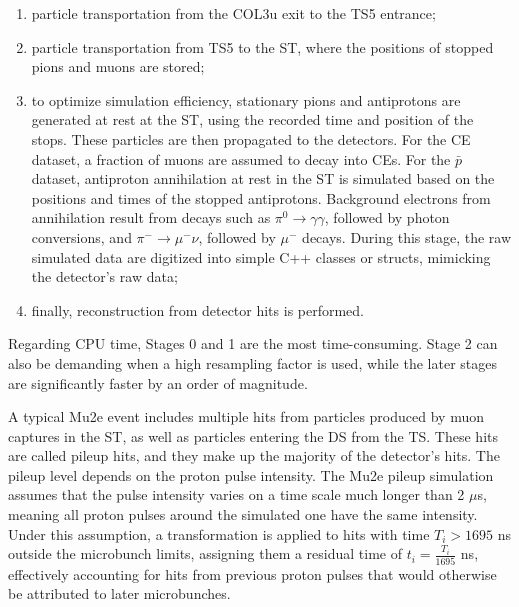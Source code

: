 \begin{enumerate}
    \item particle transportation from the COL3u exit to the TS5 entrance;

    \item particle transportation from TS5 to the ST, 
    where the positions of stopped pions and muons are stored;

    \item to optimize simulation 
    efficiency, stationary pions and antiprotons are 
    generated at rest at the ST, using the recorded time and 
    position of the stops. These particles 
    are then propagated to the detectors. 
    For the CE dataset, a fraction of muons 
    are assumed to decay into CEs. For the $\bar{p}$ dataset, 
    antiproton annihilation at rest in the ST 
    is simulated based on the positions 
    and times of the stopped antiprotons. Background 
    electrons from annihilation 
    result from decays such as $\pi^0 \to \gamma \gamma$, 
    followed by photon conversions, and $\pi^- \to \mu^- \nu$, 
    followed by $\mu^-$ decays. During 
    this stage, the raw simulated data are digitized 
    into simple C++ classes or 
    structs, mimicking the detector's raw data;

    \item finally, reconstruction 
    from detector hits is performed.
\end{enumerate}

Regarding CPU time, Stages 0 and 1 are the most time-consuming. 
Stage 2 can also be demanding when a high resampling factor is used, 
while the later stages are significantly faster by an order of magnitude.



A typical Mu2e event includes multiple hits from particles produced 
by muon captures in the ST, as well as particles entering the DS from 
the TS. These hits are called pileup hits, and they make 
up the majority of the detector's hits. The pileup level 
depends on the proton pulse intensity. The Mu2e pileup 
simulation assumes that the pulse intensity varies on a 
time scale much longer than 2 $\mu$s, meaning all proton 
pulses around the simulated one have the same intensity. 
Under this assumption, a transformation is applied to hits 
with time $T_i > 1695$ ns outside the microbunch limits, 
assigning them a residual time of $t_i = \frac{T_i}{1695}$ ns, 
effectively accounting for hits from previous proton pulses 
that would otherwise be attributed to later microbunches.


